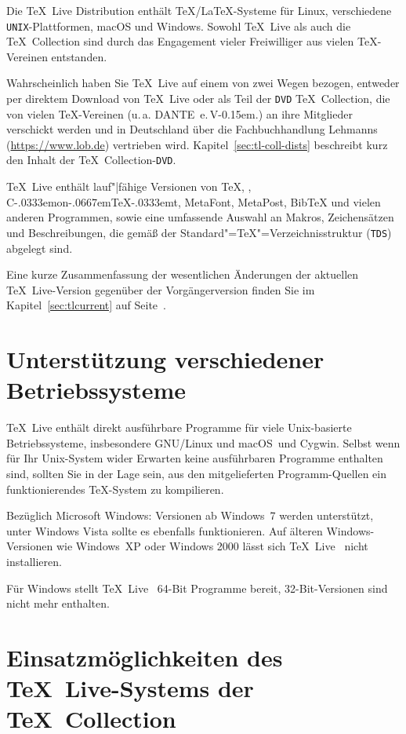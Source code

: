 \documentclass[12pt,ngerman,a4paper,fullparskip]{scrreprt}
\newcommand{\TL}{\TeX\ Live\xspace}
\newcommand{\acro}[1]{\texttt{#1}}
\def\TK{\TeX\ Collection}
\newcommand\ConTeXt{C\kern-.0333emon\-\kern-.0667em\TeX\kern-.0333emt}
\def\MP{MetaPost}
\def\MF{MetaFont}
\def\BibTeX{Bib\TeX}
\providecommand*{\DVD}{\acro{DVD}\xspace}
\providecommand*{\macOS}{macOS\xspace}
\providecommand*{\TDS}{\acro{TDS}\xspace}
\newcommand{\dante}{DANTE~e.\,V\kern-0.15em.}
\begin{document}
Die {\TL} Distribution enthält \TeX/\LaTeX-Systeme für Linux, verschiedene \acro{UNIX}-Plattformen, {\macOS} und Windows. Sowohl \TL{} als auch die \TK{} sind durch das Engagement vieler Freiwilliger aus vielen \TeX-Vereinen  entstanden. 

Wahrscheinlich haben Sie \TL{} auf einem von zwei Wegen bezogen, entweder per direktem Download von \TL{} oder als Teil der \DVD{} \TK, die von vielen \TeX-Vereinen (u.\,a. \dante) an ihre Mitglieder verschickt werden und in Deutschland über die Fachbuchhandlung Lehmanns (\url{https://www.lob.de})
vertrieben wird. Kapitel~\ref{sec:tl-coll-dists} beschreibt kurz den Inhalt der \TK-\DVD. 



{\TL} enthält lauf"|fähige Versionen von \TeX, \LaTeXe, \ConTeXt, \MF, \MP, {\BibTeX}  und vielen anderen Programmen, sowie eine umfassende Auswahl an Makros, Zeichensätzen und Beschreibungen, die gemäß der Standard"=\TeX"=Verzeichnisstruktur (\TDS) abgelegt sind.

Eine kurze Zusammenfassung der wesentlichen Änderungen der aktuellen \TL-Version gegenüber der Vorgängerversion finden Sie im Kapitel~\ref{sec:tlcurrent} auf Seite~\pageref{sec:tlcurrent}.

\section{Unterstützung verschiedener Betriebssysteme}\label{sec:os-support}

\TL{} enthält direkt ausführbare Programme für viele Unix-basierte Betriebssysteme, insbesondere GNU/Linux und \macOS\ und Cygwin. Selbst wenn für Ihr Unix-System wider Erwarten keine ausführbaren Programme enthalten sind, sollten Sie in der Lage sein, aus den mitgelieferten Programm-Quellen ein funktionierendes \TeX-System zu kompilieren.

Bezüglich Microsoft Windows: Versionen ab Windows~7 werden unterstützt, unter Windows Vista sollte es ebenfalls funktionieren. Auf älteren Windows-Versionen wie Windows~XP oder Windows 2000 lässt sich \TL~ nicht installieren.

Für Windows stellt \TL~ 64-Bit Programme bereit, 32-Bit-Versionen sind nicht mehr enthalten.

\section{Einsatzmöglichkeiten des \TL-Systems der \TeX\ Collection}\label{sec:basic}
\end{document}
